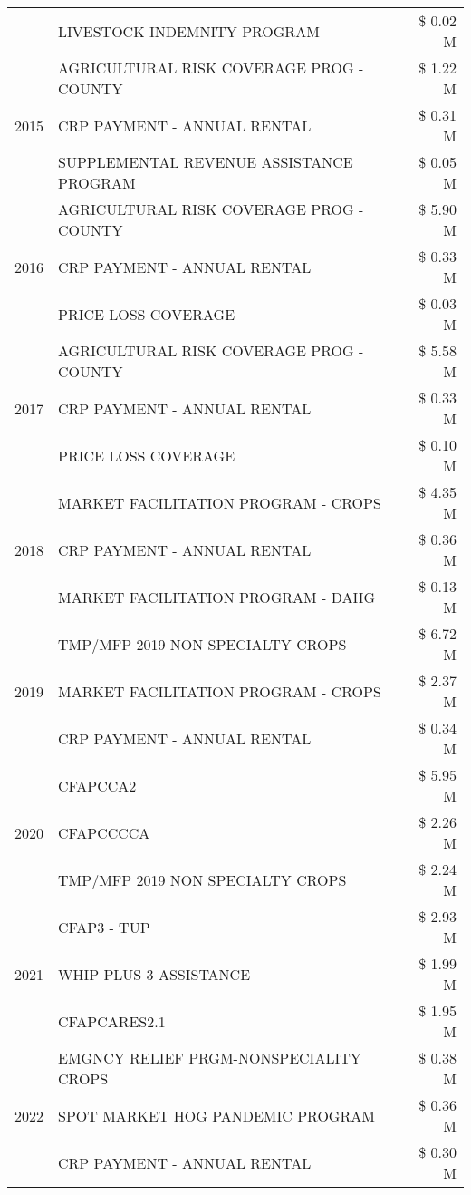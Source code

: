 \begin{tabular}{llr}
 & LIVESTOCK INDEMNITY PROGRAM & \$ 0.02 M \\
\cline{1-3}
\multirow[t]{3}{*}{2015} & AGRICULTURAL RISK COVERAGE PROG - COUNTY & \$ 1.22 M \\
 & CRP PAYMENT - ANNUAL RENTAL & \$ 0.31 M \\
 & SUPPLEMENTAL REVENUE ASSISTANCE PROGRAM & \$ 0.05 M \\
\cline{1-3}
\multirow[t]{3}{*}{2016} & AGRICULTURAL RISK COVERAGE PROG - COUNTY & \$ 5.90 M \\
 & CRP PAYMENT - ANNUAL RENTAL & \$ 0.33 M \\
 & PRICE LOSS COVERAGE & \$ 0.03 M \\
\cline{1-3}
\multirow[t]{3}{*}{2017} & AGRICULTURAL RISK COVERAGE PROG - COUNTY & \$ 5.58 M \\
 & CRP PAYMENT - ANNUAL RENTAL & \$ 0.33 M \\
 & PRICE LOSS COVERAGE & \$ 0.10 M \\
\cline{1-3}
\multirow[t]{3}{*}{2018} & MARKET FACILITATION PROGRAM - CROPS & \$ 4.35 M \\
 & CRP PAYMENT - ANNUAL RENTAL & \$ 0.36 M \\
 & MARKET FACILITATION PROGRAM - DAHG & \$ 0.13 M \\
\cline{1-3}
\multirow[t]{3}{*}{2019} & TMP/MFP 2019 NON SPECIALTY CROPS & \$ 6.72 M \\
 & MARKET FACILITATION PROGRAM - CROPS & \$ 2.37 M \\
 & CRP PAYMENT - ANNUAL RENTAL & \$ 0.34 M \\
\cline{1-3}
\multirow[t]{3}{*}{2020} & CFAPCCA2 & \$ 5.95 M \\
 & CFAPCCCCA & \$ 2.26 M \\
 & TMP/MFP 2019 NON SPECIALTY CROPS & \$ 2.24 M \\
\cline{1-3}
\multirow[t]{3}{*}{2021} & CFAP3 - TUP & \$ 2.93 M \\
 & WHIP PLUS 3 ASSISTANCE & \$ 1.99 M \\
 & CFAPCARES2.1 & \$ 1.95 M \\
\cline{1-3}
\multirow[t]{3}{*}{2022} & EMGNCY RELIEF PRGM-NONSPECIALITY CROPS & \$ 0.38 M \\
 & SPOT MARKET HOG PANDEMIC PROGRAM & \$ 0.36 M \\
 & CRP PAYMENT - ANNUAL RENTAL & \$ 0.30 M \\
\cline{1-3}
\bottomrule
\end{tabular}
